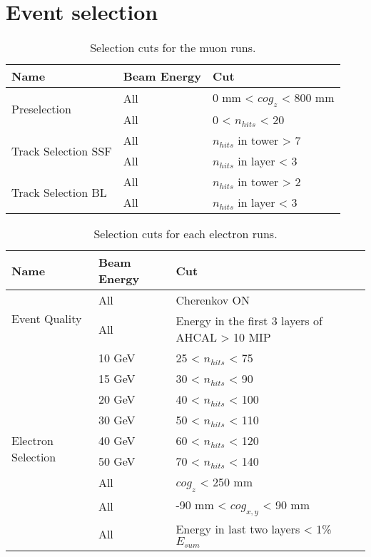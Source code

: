 \chapter{Event selection}
\label{appendix:evt_selection}

\begin{table}[htb!]
	\centering
	\caption{Selection cuts for the muon runs.}
	\label{table:muon_sel}
	\begin{tabular}{@{}lll@{}}
		\toprule
		\multicolumn{1}{l}{\textbf{Name}} & \textbf{Beam Energy} & \textbf{Cut}\\
		\midrule
		\multirow{2}{*}{Preselection}& All & 0 mm < $cog_{z}$ < 800 mm\\& All & 0 < $n_{hits}$ < 20 \\
		\multirow{2}{*}{Track Selection SSF}& All & $n_{hits}$ in tower > 7 \\& All & $n_{hits}$ in layer < 3 \\
		\multirow{2}{*}{Track Selection BL}& All & $n_{hits}$ in tower > 2 \\& All & $n_{hits}$ in layer < 3 \\
		\bottomrule
	\end{tabular}
\end{table}

\begin{table}[htb!]
	\centering
	\caption{Selection cuts for each electron runs.}
	\label{table:electron_sel}
	\begin{tabular}{@{}lll@{}}
		\toprule
		\multicolumn{1}{l}{\textbf{Name}} & \textbf{Beam Energy} & \textbf{Cut}\\
		\midrule
		\multirow{2}{*}{Event Quality}& All & Cherenkov ON\\& All & Energy in the first 3 layers of AHCAL > 10 MIP \\
		\multirow{9}{*}{Electron Selection}& 10 GeV & 25 < $n_{hits}$ < 75 \\& 15 GeV & 30 < $n_{hits}$ < 90 \\& 20 GeV & 40 < $n_{hits}$ < 100 \\& 30 GeV & 50 < $n_{hits}$ < 110 \\& 40 GeV & 60 < $n_{hits}$ < 120 \\& 50 GeV & 70 < $n_{hits}$ < 140 \\& All & $cog_{z}$ < 250 mm\\& All & -90 mm < $cog_{x, y}$ < 90 mm \\& All & Energy in last two layers < 1\% $E_{sum}$ \\
		\bottomrule
	\end{tabular}
\end{table}

